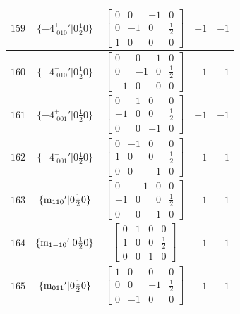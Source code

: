 \documentclass[fleqn,8pt]{jsarticle}
\begin{document}
\begin{longtable}{ccccc}
$ 159 $ & $ \{-4^{+}_{\,\,010}{}'|0 \frac{1}{2} 0\} $ & $ \begin{bmatrix} 0 & 0 & -1 & 0 \\ 0 & -1 & 0 & \frac{1}{2} \\ 1 & 0 & 0 & 0 \end{bmatrix} $ & $ -1 $ & $ -1 $ \\ \hline
$ 160 $ & $ \{-4^{-}_{\,\,010}{}'|0 \frac{1}{2} 0\} $ & $ \begin{bmatrix} 0 & 0 & 1 & 0 \\ 0 & -1 & 0 & \frac{1}{2} \\ -1 & 0 & 0 & 0 \end{bmatrix} $ & $ -1 $ & $ -1 $ \\ \hline
$ 161 $ & $ \{-4^{+}_{\,\,001}{}'|0 \frac{1}{2} 0\} $ & $ \begin{bmatrix} 0 & 1 & 0 & 0 \\ -1 & 0 & 0 & \frac{1}{2} \\ 0 & 0 & -1 & 0 \end{bmatrix} $ & $ -1 $ & $ -1 $ \\ \hline
$ 162 $ & $ \{-4^{-}_{\,\,001}{}'|0 \frac{1}{2} 0\} $ & $ \begin{bmatrix} 0 & -1 & 0 & 0 \\ 1 & 0 & 0 & \frac{1}{2} \\ 0 & 0 & -1 & 0 \end{bmatrix} $ & $ -1 $ & $ -1 $ \\ \hline
$ 163 $ & $ \{{\rm m}_{110}{}'|0 \frac{1}{2} 0\} $ & $ \begin{bmatrix} 0 & -1 & 0 & 0 \\ -1 & 0 & 0 & \frac{1}{2} \\ 0 & 0 & 1 & 0 \end{bmatrix} $ & $ -1 $ & $ -1 $ \\ \hline
$ 164 $ & $ \{{\rm m}_{1-10}{}'|0 \frac{1}{2} 0\} $ & $ \begin{bmatrix} 0 & 1 & 0 & 0 \\ 1 & 0 & 0 & \frac{1}{2} \\ 0 & 0 & 1 & 0 \end{bmatrix} $ & $ -1 $ & $ -1 $ \\ \hline
$ 165 $ & $ \{{\rm m}_{011}{}'|0 \frac{1}{2} 0\} $ & $ \begin{bmatrix} 1 & 0 & 0 & 0 \\ 0 & 0 & -1 & \frac{1}{2} \\ 0 & -1 & 0 & 0 \end{bmatrix} $ & $ -1 $ & $ -1 $ \\ \hline

\end{longtable}
\end{document}

